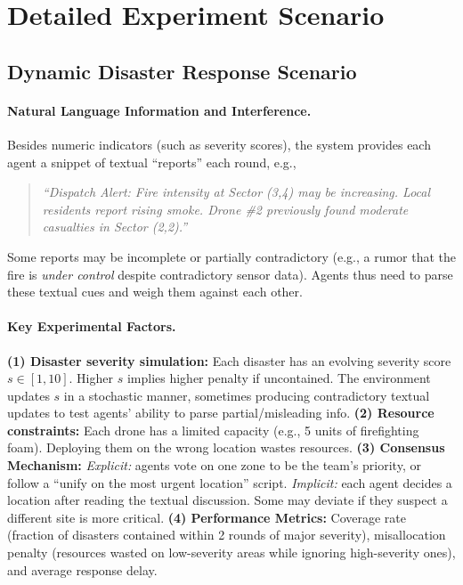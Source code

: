 \appendix
\section{Detailed Experiment Scenario}
\label{sec:appendix:a}

\subsection{Dynamic Disaster Response Scenario}

\paragraph{Natural Language Information and Interference.}
Besides numeric indicators (such as severity scores), the system provides each agent a snippet of textual “reports” each round, e.g.,
\begin{quote}
\small
\emph{``Dispatch Alert: Fire intensity at Sector (3,4) may be increasing. Local residents report rising smoke. Drone \#2 previously found moderate casualties in Sector (2,2).''}
\normalsize
\end{quote}
Some reports may be incomplete or partially contradictory (e.g., a rumor that the fire is \emph{under control} despite contradictory sensor data). Agents thus need to parse these textual cues and weigh them against each other.

\paragraph{Key Experimental Factors.} \textbf{(1) Disaster severity simulation:} Each disaster has an evolving severity score $s \in [1,10]$. Higher $s$ implies higher penalty if uncontained. The environment updates $s$ in a stochastic manner, sometimes producing contradictory textual updates to test agents' ability to parse partial/misleading info. \textbf{(2) Resource constraints:} Each drone has a limited capacity (e.g., 5 units of firefighting foam). Deploying them on the wrong location wastes resources. \textbf{(3) Consensus Mechanism:} \emph{Explicit:} agents vote on one zone to be the team’s priority, or follow a “unify on the most urgent location” script. \emph{Implicit:} each agent decides a location after reading the textual discussion. Some may deviate if they suspect a different site is more critical. \textbf{(4) Performance Metrics:} Coverage rate (fraction of disasters contained within 2 rounds of major severity), misallocation penalty (resources wasted on low-severity areas while ignoring high-severity ones), and average response delay.

